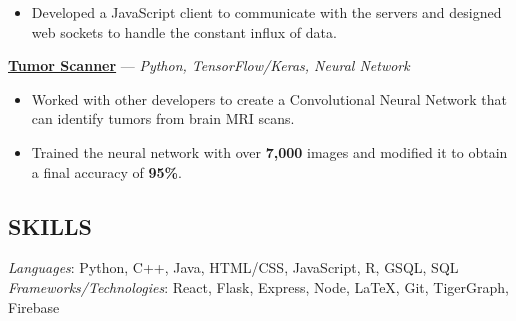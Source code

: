 \documentclass[11pt]{res}
\begin{document}
\begin{footnotesize}
\begin{resume}
\begin{itemize}[leftmargin=6.25mm]
\item Developed a JavaScript client to communicate with the servers and designed web sockets to handle the constant influx of data.
\end{itemize}
\vspace{-2.5mm}
\href{https://github.com/CharlesShi12/AI_Tumor_Scanner}{\textbf{Tumor Scanner}} — {\sl Python, TensorFlow/Keras, Neural Network}\vspace{-4.5mm}
\begin{itemize}[leftmargin=6.25mm] \itemsep -2pt 
\item Worked with other developers to create a Convolutional Neural Network that can identify tumors from brain MRI scans.
\vspace{1.30mm}
\item Trained the neural network with over \textbf{7,000} images and modified it to obtain a final accuracy of \textbf{95\%}. 
\end{itemize}
\begin{small}
\section{SKILLS}
\end{small} 
\vspace{.5mm}
{\sl Languages}: 
Python, C++, Java, HTML/CSS, JavaScript, R, GSQL, SQL\\
{\sl Frameworks/Technologies}: React, Flask, Express, Node, LaTeX, Git, TigerGraph, Firebase

\end{resume}
\end{footnotesize}
\end{document}
